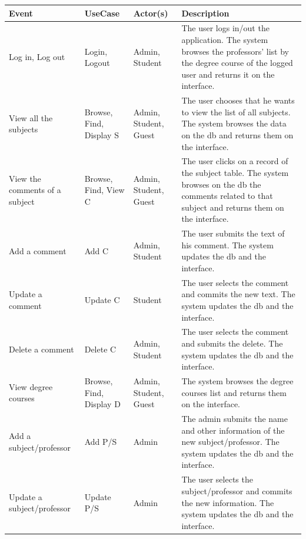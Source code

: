 \documentclass[a4paper]{article}
\begin{document}
\begin{table}[h]
\centering
\begin{tabular}{p{}p{}lp{}}
\hline
\textbf{Event} & \textbf{UseCase} & \textbf{Actor(s)} & \textbf{Description}\\ \hline

Log in, Log out & Login,  Logout & Admin, Student & The user logs in/out the application. The system browses the professors' list by the degree course of the logged user and returns it on the interface.\\ \hline

View all the subjects & Browse, Find, Display S & Admin, Student, Guest & The user chooses that he wants to view the list of all subjects. The system browses the data on the db and returns them on the interface.\\ \hline

View the comments of a subject & Browse, Find, View C & Admin, Student, Guest & The user clicks on a record of the subject table. The system browses on the db the comments related to that subject and returns them on the interface.\\ \hline

Add a comment & Add C & Admin, Student & The user submits the text of his comment. The system updates the db and the interface.\\ \hline

Update a comment & Update C & Student & The user selects the comment and commits the new text. The system updates the db and the interface.\\ \hline

Delete a comment & Delete C & Admin, Student & The user selects the comment and submits the delete. The system updates the db and the interface.\\ \hline

View degree courses & Browse, Find, Display D & Admin, Student, Guest & The system browses the degree courses list and returns them on the interface.\\ \hline

Add a subject/professor & Add P/S & Admin & The admin submits the name and other information of the new subject/professor. The system updates the db and the interface.\\ \hline

Update a subject/professor & Update P/S & Admin & The user selects the subject/professor and commits the new information. The system updates the db and the interface.\\ \hline


\end{tabular}
\end{table}
\end{document}
